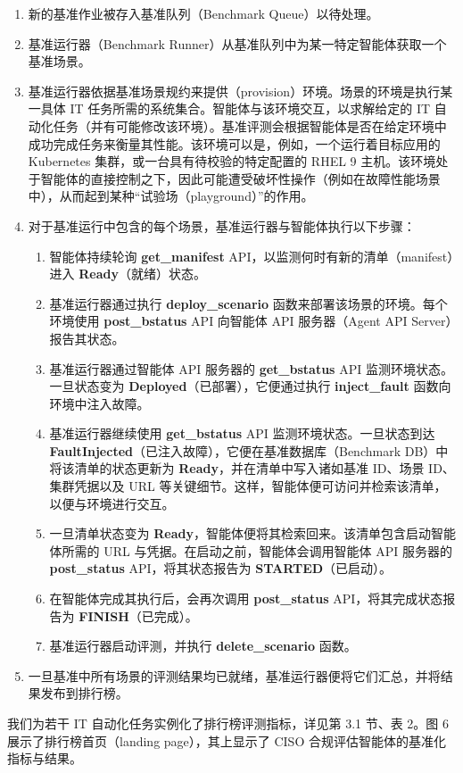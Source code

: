 \begin{enumerate}
\item 新的基准作业被存入基准队列（Benchmark Queue）以待处理。
\item 基准运行器（Benchmark Runner）从基准队列中为某一特定智能体获取一个基准场景。
\item 基准运行器依据基准场景规约来提供（provision）环境。场景的环境是执行某一具体 IT 任务所需的系统集合。智能体与该环境交互，以求解给定的 IT 自动化任务（并有可能修改该环境）。基准评测会根据智能体是否在给定环境中成功完成任务来衡量其性能。该环境可以是，例如，一个运行着目标应用的 Kubernetes 集群，或一台具有待校验的特定配置的 RHEL 9 主机。该环境处于智能体的直接控制之下，因此可能遭受破坏性操作（例如在故障性能场景中），从而起到某种“试验场（playground）”的作用。
\item 对于基准运行中包含的每个场景，基准运行器与智能体执行以下步骤：
\begin{enumerate}
\item[(a)] 智能体持续轮询 \textbf{get\_manifest} API，以监测何时有新的清单（manifest）进入 \textbf{Ready}（就绪）状态。
\item[(b)] 基准运行器通过执行 \textbf{deploy\_scenario} 函数来部署该场景的环境。每个环境使用 \textbf{post\_bstatus} API 向智能体 API 服务器（Agent API Server）报告其状态。
\item[(c)] 基准运行器通过智能体 API 服务器的 \textbf{get\_bstatus} API 监测环境状态。一旦状态变为 \textbf{Deployed}（已部署），它便通过执行 \textbf{inject\_fault} 函数向环境中注入故障。
\item[(d)] 基准运行器继续使用 \textbf{get\_bstatus} API 监测环境状态。一旦状态到达 \textbf{FaultInjected}（已注入故障），它便在基准数据库（Benchmark DB）中将该清单的状态更新为 \textbf{Ready}，并在清单中写入诸如基准 ID、场景 ID、集群凭据以及 URL 等关键细节。这样，智能体便可访问并检索该清单，以便与环境进行交互。
\item[(e)] 一旦清单状态变为 \textbf{Ready}，智能体便将其检索回来。该清单包含启动智能体所需的 URL 与凭据。在启动之前，智能体会调用智能体 API 服务器的 \textbf{post\_status} API，将其状态报告为 \textbf{STARTED}（已启动）。
\item[(f)] 在智能体完成其执行后，会再次调用 \textbf{post\_status} API，将其完成状态报告为 \textbf{FINISH}（已完成）。
\item[(g)] 基准运行器启动评测，并执行 \textbf{delete\_scenario} 函数。
\end{enumerate}
\item 一旦基准中所有场景的评测结果均已就绪，基准运行器便将它们汇总，并将结果发布到排行榜。
\end{enumerate}

我们为若干 IT 自动化任务实例化了排行榜评测指标，详见第 3.1 节、表 2。图 6 展示了排行榜首页（landing page），其上显示了 CISO 合规评估智能体的基准化指标与结果。
